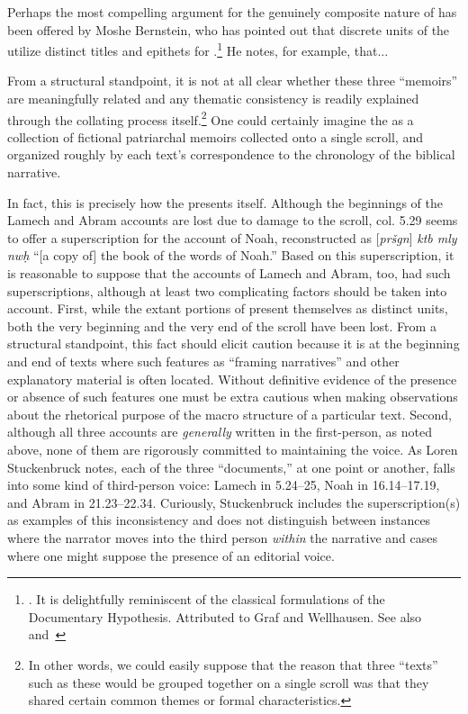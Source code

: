 Perhaps the most compelling argument for the genuinely composite nature of \ga has been offered by Moshe Bernstein, who has pointed out that discrete units of the \ga utilize distinct titles and epithets for \yahweh.\footnote{\cite{bernstein_jbl2009}. It is delightfully reminiscent of the classical formulations of the Documentary Hypothesis. Attributed to Graf and Wellhausen.  See also~\cite{bernstein_as2010} and~\cite{weigold_as2010}} He notes, for example, that...


From a structural standpoint, it is not at all clear whether these three ``memoirs'' are meaningfully related and any thematic consistency is readily explained through the collating process itself.\footnote{In other words, we could easily suppose that the reason that three ``texts'' such as these would be grouped together on a single scroll was that they shared certain common themes or formal characteristics.} One could certainly imagine the \ga as a collection of fictional patriarchal memoirs collected onto a single scroll, and organized roughly by each text's correspondence to the chronology of the biblical narrative. 

In fact, this is precisely how the \ga presents itself. Although the beginnings of the Lamech and Abram accounts are lost due to damage to the scroll, col. 5.29 seems to offer a superscription for the account of Noah, reconstructed as [\emph{pršgn}] \emph{ktb mly nwḥ} ``[a copy of] the book of the words of Noah.'' Based on this superscription, it is reasonable to suppose that the accounts of Lamech and Abram, too, had such superscriptions, although at least two complicating factors should be taken into account. First, while the extant portions of \ga present themselves as distinct units, both the very beginning and the very end of the scroll have been lost. From a structural standpoint, this fact should elicit caution because it is at the beginning and end of texts where such features as ``framing narratives'' and other explanatory material is often located. Without definitive evidence of the presence or absence of such features one must be extra cautious when making observations about the rhetorical purpose of the macro structure of a particular text. Second, although all three accounts are \emph{generally} written in the first-person, as noted above, none of them are rigorously committed to maintaining the voice. As Loren Stuckenbruck notes, each of the three ``documents,'' at one point or another, falls into some kind of third-person voice: Lamech in 5.24--25, Noah in 16.14--17.19, and Abram in 21.23--22.34. Curiously, Stuckenbruck includes the superscription(s) as examples of this inconsistency and does not distinguish between instances where the narrator moves into the third person \emph{within} the narrative and cases where one might suppose the presence of an editorial voice.


